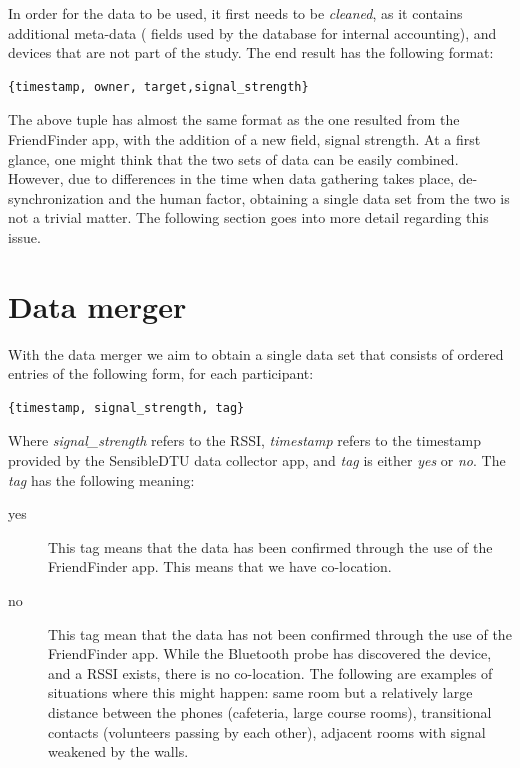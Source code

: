 In order for the data to be used, it first needs to be \textit{cleaned}, as it contains additional meta-data ( fields used by the database for internal accounting), and devices that are not part of the study. The end result has the following format:

\begin{verbatim}
{timestamp, owner, target,signal_strength}
\end{verbatim}
 
 The above tuple has almost the same format as the one resulted from the FriendFinder app, with the addition of a new field, signal strength. At a first glance, one might think that the two sets of data can be easily combined. However, due to differences in the time when data gathering takes place, de-synchronization and the human factor, obtaining a single data set from the two is not a trivial matter. The following section goes into more detail regarding this issue.
 
\section{Data merger}
\label{sec:data_merger}
With the data merger we aim to obtain a single data set that consists of ordered entries of the following form, for each participant:

\begin{verbatim}
{timestamp, signal_strength, tag}
\end{verbatim} 

Where \textit{signal\_strength} refers to the RSSI, \textit{timestamp} refers to the timestamp provided by the SensibleDTU data collector app, and \textit{tag} is either \textit{yes} or \textit{no}. The \textit{tag} has the following meaning:

\begin{description}
  \item[yes] This tag means that the data has been confirmed through the use of the FriendFinder app. This means that we have co-location.
  \item[no] This tag mean that the data has not been confirmed through the use of the FriendFinder app. While the Bluetooth probe has discovered the device, and a RSSI exists, there is no co-location. The following are examples of situations where this might happen:  same room but a relatively large distance between the phones (cafeteria, large course rooms), transitional contacts (volunteers passing by each other), adjacent rooms with signal weakened by the walls. 
\end{description}

